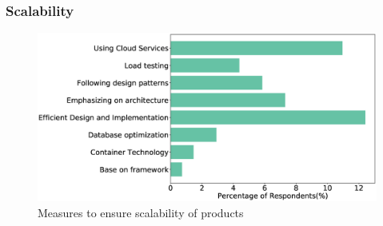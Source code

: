 \subsubsection{Scalability}
\label{Scalability}
\begin{figure}[htbp]
\includegraphics[scale=0.28]{Figures/Scalability.eps} 
\caption{Measures to ensure scalability of products}
\label{fig:Measures to ensure scalability}
\end{figure}

